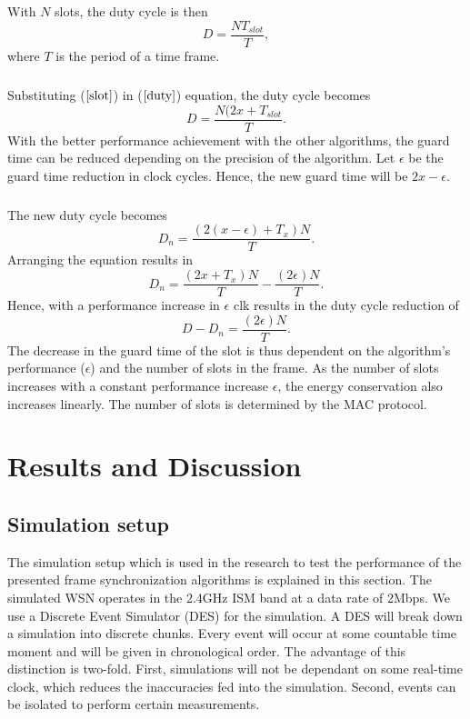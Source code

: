\documentclass[a4paper,10pt]{report}
\begin{document}
\paragraph*{}
With $N$ slots, the duty cycle is then
\begin{equation}
D = \frac{NT_{slot}}{T}, \label{duty}
\end{equation}
where $T$ is the period of a time frame. \paragraph*{} Substituting ($\ref{slot}$) in ($\ref{duty}$) equation, the duty cycle becomes
\begin{equation}
D= \frac{N(2x+T_{slot}}{T}.
\end{equation}
With the better performance achievement with the other algorithms, the guard time can be reduced depending on the precision of the
algorithm. Let $\epsilon$ be the guard time reduction in clock cycles. Hence, the new guard time will be $2x-\epsilon$.
\paragraph*{} The new duty cycle becomes
\begin{equation}
D_n=\frac{(2(x-\epsilon)+T_x)N}{T}.
\end{equation}
Arranging the equation results in
\begin{equation}
D_n= \frac{(2x+T_x)N}{T} - \frac{(2\epsilon)N}{T}.
\end{equation}
Hence, with a performance increase in $\epsilon$ clk results in the duty cycle reduction of
\begin{equation}
D - D_n = \frac{(2\epsilon)N}{T}.
\end{equation}
The decrease in the guard time of the slot is thus dependent on the algorithm's performance ($\epsilon$) and the number of slots in the
frame. As the number of slots increases with a constant performance increase $\epsilon$, the energy conservation also increases linearly. The number of slots is determined by the MAC protocol.
\chapter{\textbf{Results and Discussion}}
\section{\textbf{Simulation setup}}
The simulation setup which is used in the research to test the performance of the presented frame synchronization algorithms is explained in this section. The simulated WSN operates in the 2.4GHz ISM band at a data rate of 2Mbps. We use a Discrete Event Simulator (DES) for the simulation. A DES will break down a simulation into discrete chunks. Every event will occur at some countable time moment and will be given in chronological order. The advantage of this distinction is two-fold. First, simulations will not be dependant on some real-time clock, which reduces the inaccuracies fed into the simulation. Second, events can be isolated to perform certain measurements.
\end{document}
